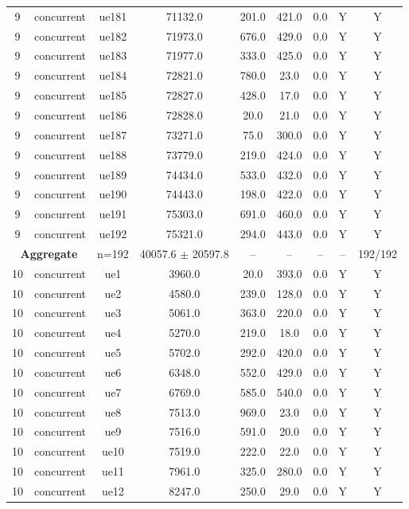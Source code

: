 \begin{table}[ht]
\begin{tabular}{|c|c|c|c|c|c|c|c|c|}
9 & concurrent & ue181 & 71132.0 & 201.0 & 421.0 & 0.0 & Y & Y \\
9 & concurrent & ue182 & 71973.0 & 676.0 & 429.0 & 0.0 & Y & Y \\
9 & concurrent & ue183 & 71977.0 & 333.0 & 425.0 & 0.0 & Y & Y \\
9 & concurrent & ue184 & 72821.0 & 780.0 & 23.0 & 0.0 & Y & Y \\
9 & concurrent & ue185 & 72827.0 & 428.0 & 17.0 & 0.0 & Y & Y \\
9 & concurrent & ue186 & 72828.0 & 20.0 & 21.0 & 0.0 & Y & Y \\
9 & concurrent & ue187 & 73271.0 & 75.0 & 300.0 & 0.0 & Y & Y \\
9 & concurrent & ue188 & 73779.0 & 219.0 & 424.0 & 0.0 & Y & Y \\
9 & concurrent & ue189 & 74434.0 & 533.0 & 432.0 & 0.0 & Y & Y \\
9 & concurrent & ue190 & 74443.0 & 198.0 & 422.0 & 0.0 & Y & Y \\
9 & concurrent & ue191 & 75303.0 & 691.0 & 460.0 & 0.0 & Y & Y \\
9 & concurrent & ue192 & 75321.0 & 294.0 & 443.0 & 0.0 & Y & Y \\
\multicolumn{2}{|c|}{\textbf{Aggregate}} & n=192 & 40057.6 $\pm$ 20597.8 & -- & -- & -- & -- & 192/192 \\
\hline
10 & concurrent & ue1 & 3960.0 & 20.0 & 393.0 & 0.0 & Y & Y \\
10 & concurrent & ue2 & 4580.0 & 239.0 & 128.0 & 0.0 & Y & Y \\
10 & concurrent & ue3 & 5061.0 & 363.0 & 220.0 & 0.0 & Y & Y \\
10 & concurrent & ue4 & 5270.0 & 219.0 & 18.0 & 0.0 & Y & Y \\
10 & concurrent & ue5 & 5702.0 & 292.0 & 420.0 & 0.0 & Y & Y \\
10 & concurrent & ue6 & 6348.0 & 552.0 & 429.0 & 0.0 & Y & Y \\
10 & concurrent & ue7 & 6769.0 & 585.0 & 540.0 & 0.0 & Y & Y \\
10 & concurrent & ue8 & 7513.0 & 969.0 & 23.0 & 0.0 & Y & Y \\
10 & concurrent & ue9 & 7516.0 & 591.0 & 20.0 & 0.0 & Y & Y \\
10 & concurrent & ue10 & 7519.0 & 222.0 & 22.0 & 0.0 & Y & Y \\
10 & concurrent & ue11 & 7961.0 & 325.0 & 280.0 & 0.0 & Y & Y \\
10 & concurrent & ue12 & 8247.0 & 250.0 & 29.0 & 0.0 & Y & Y \\

\end{tabular}
\end{table}
